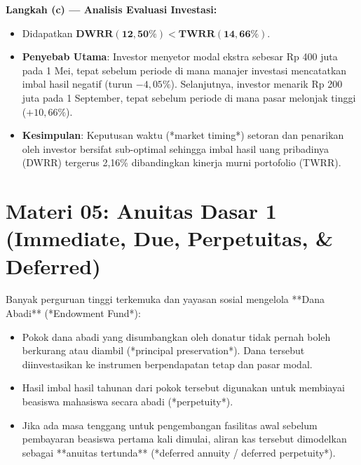 \documentclass[11pt,a4paper]{article}
\begin{document}
\begin{solusibox}
\textbf{Langkah (c) --- Analisis Evaluasi Investasi:}
\begin{itemize}[leftmargin=4mm, topsep=1pt, itemsep=1pt]
    \item Didapatkan $\mathbf{DWRR (12{,}50\%) < TWRR (14{,}66\%)}$.
    \item \textbf{Penyebab Utama}: Investor menyetor modal ekstra sebesar Rp 400 juta pada 1 Mei, tepat sebelum periode di mana manajer investasi mencatatkan imbal hasil negatif (turun $-4{,}05\%$). Selanjutnya, investor menarik Rp 200 juta pada 1 September, tepat sebelum periode di mana pasar melonjak tinggi ($+10{,}66\%$).
    \item \textbf{Kesimpulan}: Keputusan waktu (*market timing*) setoran dan penarikan oleh investor bersifat sub-optimal sehingga imbal hasil uang pribadinya (DWRR) tergerus 2,16\% dibandingkan kinerja murni portofolio (TWRR).
\end{itemize}
\end{solusibox}

\newpage

\section*{Materi 05: Anuitas Dasar 1 (Immediate, Due, Perpetuitas, \& Deferred)}

\begin{kasusbox}
Banyak perguruan tinggi terkemuka dan yayasan sosial mengelola **Dana Abadi** (*Endowment Fund*):
\begin{itemize}[leftmargin=4mm, topsep=1pt, itemsep=1pt]
    \item Pokok dana abadi yang disumbangkan oleh donatur tidak pernah boleh berkurang atau diambil (*principal preservation*). Dana tersebut diinvestasikan ke instrumen berpendapatan tetap dan pasar modal.
    \item Hasil imbal hasil tahunan dari pokok tersebut digunakan untuk membiayai beasiswa mahasiswa secara abadi (*perpetuity*).
    \item Jika ada masa tenggang untuk pengembangan fasilitas awal sebelum pembayaran beasiswa pertama kali dimulai, aliran kas tersebut dimodelkan sebagai **anuitas tertunda** (*deferred annuity / deferred perpetuity*).
\end{itemize}
\end{kasusbox}
\end{document}
